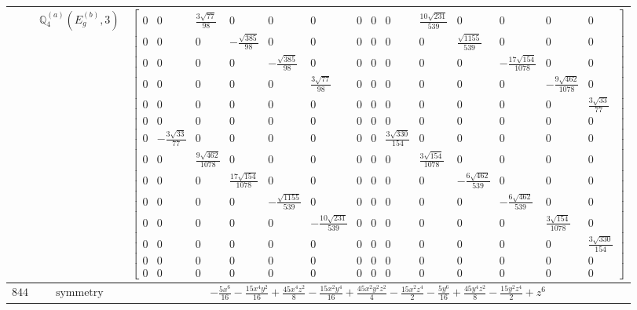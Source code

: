 \documentclass[fleqn,8pt,landscape]{jsarticle}
\begin{document}
\begin{longtable}{ccc}
$  $ & $ \mathbb{Q}_{4}^{(a)}(E_{g}^{(b)},3) $ & $ \begin{bmatrix} 0 & 0 & \frac{3 \sqrt{77}}{98} & 0 & 0 & 0 & 0 & 0 & 0 & \frac{10 \sqrt{231}}{539} & 0 & 0 & 0 & 0 \\ 0 & 0 & 0 & - \frac{\sqrt{385}}{98} & 0 & 0 & 0 & 0 & 0 & 0 & \frac{\sqrt{1155}}{539} & 0 & 0 & 0 \\ 0 & 0 & 0 & 0 & - \frac{\sqrt{385}}{98} & 0 & 0 & 0 & 0 & 0 & 0 & - \frac{17 \sqrt{154}}{1078} & 0 & 0 \\ 0 & 0 & 0 & 0 & 0 & \frac{3 \sqrt{77}}{98} & 0 & 0 & 0 & 0 & 0 & 0 & - \frac{9 \sqrt{462}}{1078} & 0 \\ 0 & 0 & 0 & 0 & 0 & 0 & 0 & 0 & 0 & 0 & 0 & 0 & 0 & \frac{3 \sqrt{33}}{77} \\ 0 & 0 & 0 & 0 & 0 & 0 & 0 & 0 & 0 & 0 & 0 & 0 & 0 & 0 \\ 0 & - \frac{3 \sqrt{33}}{77} & 0 & 0 & 0 & 0 & 0 & 0 & \frac{3 \sqrt{330}}{154} & 0 & 0 & 0 & 0 & 0 \\ 0 & 0 & \frac{9 \sqrt{462}}{1078} & 0 & 0 & 0 & 0 & 0 & 0 & \frac{3 \sqrt{154}}{1078} & 0 & 0 & 0 & 0 \\ 0 & 0 & 0 & \frac{17 \sqrt{154}}{1078} & 0 & 0 & 0 & 0 & 0 & 0 & - \frac{6 \sqrt{462}}{539} & 0 & 0 & 0 \\ 0 & 0 & 0 & 0 & - \frac{\sqrt{1155}}{539} & 0 & 0 & 0 & 0 & 0 & 0 & - \frac{6 \sqrt{462}}{539} & 0 & 0 \\ 0 & 0 & 0 & 0 & 0 & - \frac{10 \sqrt{231}}{539} & 0 & 0 & 0 & 0 & 0 & 0 & \frac{3 \sqrt{154}}{1078} & 0 \\ 0 & 0 & 0 & 0 & 0 & 0 & 0 & 0 & 0 & 0 & 0 & 0 & 0 & \frac{3 \sqrt{330}}{154} \\ 0 & 0 & 0 & 0 & 0 & 0 & 0 & 0 & 0 & 0 & 0 & 0 & 0 & 0 \\ 0 & 0 & 0 & 0 & 0 & 0 & 0 & 0 & 0 & 0 & 0 & 0 & 0 & 0 \end{bmatrix} $ \\ \hline
$ 844 $ & $ \text{symmetry} $ & $ - \frac{5 x^{6}}{16} - \frac{15 x^{4} y^{2}}{16} + \frac{45 x^{4} z^{2}}{8} - \frac{15 x^{2} y^{4}}{16} + \frac{45 x^{2} y^{2} z^{2}}{4} - \frac{15 x^{2} z^{4}}{2} - \frac{5 y^{6}}{16} + \frac{45 y^{4} z^{2}}{8} - \frac{15 y^{2} z^{4}}{2} + z^{6} $ \\

\end{longtable}
\end{document}
